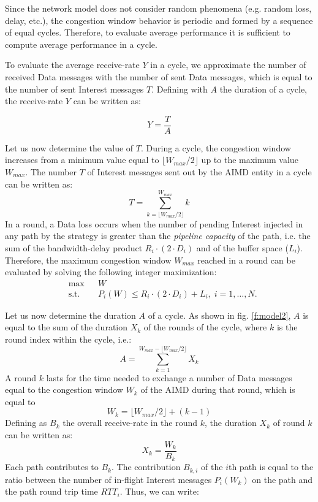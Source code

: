 \documentclass{sig-alternate-10pt}
\begin{document}
Since the network model does not consider random phenomena (e.g. random loss, delay, etc.), the congestion window behavior is periodic and formed by a sequence of equal cycles. Therefore, to evaluate average performance it is sufficient to compute average performance in a cycle.

To evaluate the average receive-rate $Y$ in a cycle, we approximate the number of received Data messages with the number of sent Data messages, which is equal to the number of sent Interest messages $T$.
Defining with $A$ the duration of a cycle, the receive-rate $Y$ can be written as:

\begin{equation}
Y = \frac{T}{A}
\label{eq:1}
\end{equation}

Let us now determine the value of $T$. During a cycle, the congestion window increases from a minimum value equal to $\lfloor W_{max} / 2 \rfloor$ up to the maximum value $W_{max}$. The number $T$ of Interest messages sent out by the AIMD entity in a cycle can be written as:
\begin{equation}
T = \sum_{k=\lfloor W_{max}/2 \rfloor}^{W_{max}} k
\label{eq:2}
\end{equation}
In a round, a Data loss occurs when the number of pending Interest injected in any path by the strategy is greater than the \emph{pipeline capacity} of the path, i.e. the sum of the bandwidth-delay product $R_i \cdot (2 \cdot D_i)$ and of the buffer space ($L_i$). Therefore, the maximum congestion window $W_{max}$ reached in a round can be evaluated by solving the following integer maximization:
\begin{equation}
\begin{aligned}
& \text{max}
&& W \\
& \text{s.t.}
&& P_i(W) \leq R_i \cdot (2 \cdot D_i)+L_i, \; i = 1, \ldots, N.
\end{aligned}
\end{equation}

Let us now determine the duration $A$ of a cycle. As shown in fig. \ref{f:model2}, $A$ is equal to the sum of the duration $X_k$ of the rounds of the cycle, where $k$ is the round index within the cycle, i.e.:
\begin{equation}
A = \sum_{k=1}^{W_{max}-\lfloor W_{max}/2 \rfloor} X_k
\label{eq:3}
\end{equation}
A round $k$ lasts for the time needed to exchange a number of Data messages equal to the congestion window $W_k$ of the AIMD during that round, which is equal to
\begin{equation}
W_k = \lfloor W_{max}/2 \rfloor + (k-1)
\end{equation}
Defining as $B_k$ the overall receive-rate in the round $k$, the duration $X_k$ of round $k$ can be written as:
\begin{equation}
X_k = \frac{W_k}{B_k}
\end{equation}
Each path contributes to $B_k$. The contribution $B_{k,i}$ of the $i$th path is equal to the ratio between the number of in-flight Interest messages $P_i(W_k)$ on the path and the path round trip time $RTT_i$. Thus, we can write:
\end{document}
